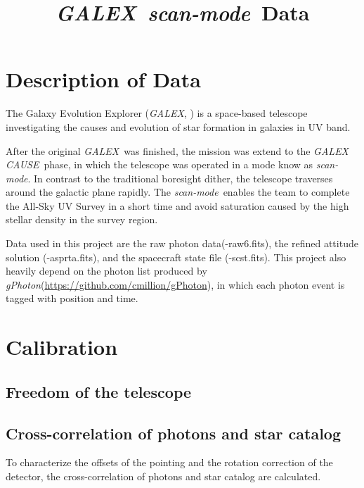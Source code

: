 \documentclass[12pt, preprint]{aastex}
\newcommand{\project}[1]{\textsl{#1}}
\newcommand{\galex}{\project{GALEX}}
\newcommand{\cause}{\project{GALEX CAUSE}}
\newcommand{\scanmode}{\project{scan-mode}}
\newcommand{\gphoton}{\project{gPhoton}}
\begin{document}
\title{\galex\ \scanmode\ Data}
\author{}

\section{Description of Data}
The Galaxy Evolution Explorer (\galex, \citealt{galex}) is a space-based telescope investigating the causes and evolution of star formation in galaxies in UV band.

After the original \galex\ was finished, the mission was extend to the \cause\ phase, in which the telescope was operated in a mode know as \scanmode.
In contrast to the traditional boresight dither, the telescope traverses around the galactic plane rapidly. 
The \scanmode\ enables the team to  complete the All-Sky UV Survey in a short time and avoid saturation caused by the high stellar density in the survey region.

Data used in this project are the raw photon data(-raw6.fits), the refined attitude solution (-asprta.fits), and the spacecraft state file (-scst.fits). This project also heavily depend on the photon list produced by \gphoton (\url{https://github.com/cmillion/gPhoton}), in which each photon event is tagged with position  and time.

\section{Calibration}

\subsection{Freedom of the telescope}


\subsection{Cross-correlation of photons and star catalog}
To characterize the offsets of the pointing and the rotation correction of the detector, the cross-correlation of photons and star catalog are calculated. 
\end{document}

